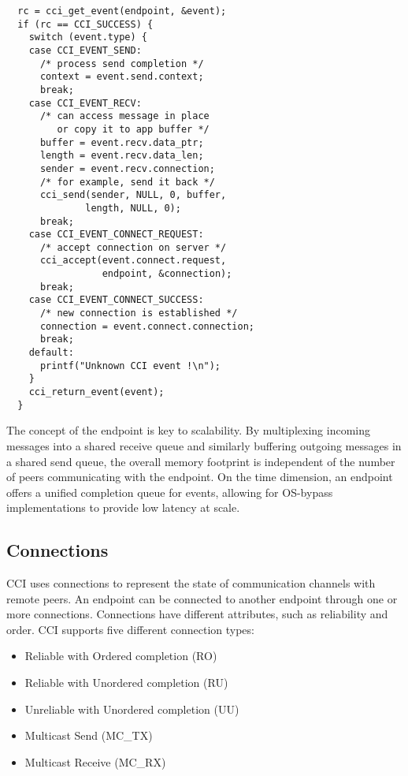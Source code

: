 \lstset{language=C, frame=single, basicstyle=\small}
\begin{lstlisting}
  rc = cci_get_event(endpoint, &event);
  if (rc == CCI_SUCCESS) {
    switch (event.type) {
    case CCI_EVENT_SEND:
      /* process send completion */
      context = event.send.context;
      break;
    case CCI_EVENT_RECV:
      /* can access message in place 
         or copy it to app buffer */
      buffer = event.recv.data_ptr;
      length = event.recv.data_len;
      sender = event.recv.connection;
      /* for example, send it back */
      cci_send(sender, NULL, 0, buffer, 
              length, NULL, 0);
      break;
    case CCI_EVENT_CONNECT_REQUEST:
      /* accept connection on server */
      cci_accept(event.connect.request, 
                 endpoint, &connection);
      break;
    case CCI_EVENT_CONNECT_SUCCESS:
      /* new connection is established */
      connection = event.connect.connection;
      break;
    default:
      printf("Unknown CCI event !\n");
    }
    cci_return_event(event);
  }
\end{lstlisting}

The concept of the endpoint is key to scalability. By multiplexing incoming 
messages into a shared receive queue and similarly buffering outgoing 
messages in a shared send queue, the overall memory footprint is independent 
of the number of peers communicating with the endpoint. On the time dimension, 
an endpoint offers a unified completion queue for events, allowing for 
OS-bypass implementations to provide low latency at scale. 



\subsection{Connections}
CCI uses connections to represent the state of communication channels with 
remote peers. An endpoint can be connected to another endpoint through one or 
more connections. Connections have different attributes, such as 
reliability and order. CCI supports five different connection types:

\begin{itemize}
\item Reliable with Ordered completion (RO)
\item Reliable with Unordered completion (RU)
\item Unreliable with Unordered completion (UU)
\item Multicast Send (MC\_TX)
\item Multicast Receive (MC\_RX)
\end{itemize}


